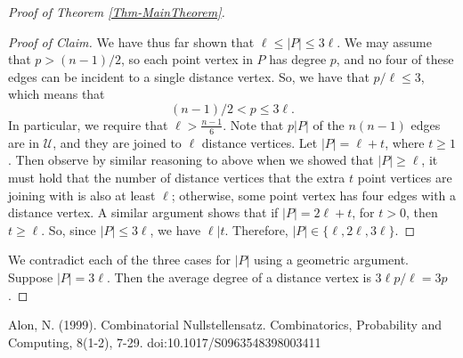 \documentclass[12pt]{article}
\theoremstyle{definition}
\begin{document}
\begin{proof}[Proof of Theorem \ref{Thm-MainTheorem}]
\begin{proof}[Proof of Claim]
			We have thus far shown that $\ell \leq |P| \leq 3\ell$.  
			We may assume that $p > (n-1)/2$, so each point vertex in $P$ has degree $p$, and no four of these edges can be incident to a single distance vertex.  So, we have that $p/\ell \leq 3$, which means that
			$$(n-1)/2 < p \leq 3\ell.$$
			In particular, we require that $\ell > \tfrac{n-1}{6}$.  Note that $p |P|$ of the $n(n-1)$ edges are in $\mathcal{U}$, and they are joined to $\ell$ distance vertices.  Let $|P| = \ell + t$, where $t \geq 1$.  Then observe by similar reasoning to above when we showed that $|P| \geq \ell$, it must hold that the number of distance vertices that the extra $t$ point vertices are joining with is also at least $\ell$; otherwise, some point vertex has four edges with a distance vertex.  A similar argument shows that if $|P| = 2\ell + t$, for $t >0$, then $t \geq \ell$.  So, since $|P| \leq 3\ell$, we have $\ell | t$.  Therefore, $|P| \in \{\ell, 2\ell, 3\ell\}$. \qedhere
		\end{proof}
		 We contradict each of the three cases for $|P|$ using a geometric argument.
		 Suppose $|P| = 3\ell$.  Then the average degree of a distance vertex is $3\ell p /\ell = 3p$.
	\end{proof}
	
	\newpage
	\begin{thebibliography}{100}
		 Alon, N. (1999). Combinatorial Nullstellensatz. Combinatorics, Probability and Computing, 8(1-2), 7-29. doi:10.1017/S0963548398003411
	\end{thebibliography}
	
\end{document}
